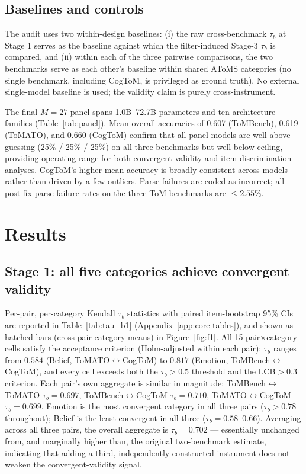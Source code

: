 \documentclass{article} %
\begin{document}
 

\subsection{Baselines and controls}
\label{sec:methods-baselines}
 
The audit uses two within-design baselines: (i) the raw cross-benchmark $\tau_b$ at Stage 1 serves as the baseline against which the filter-induced Stage-3 $\tau_b$ is compared, and (ii) within each of the three pairwise comparisons, the two benchmarks serve as each other's baseline within shared AToMS categories (no single benchmark, including CogToM, is privileged as ground truth). No external single-model baseline is used; the validity claim is purely cross-instrument.
 
The final $M=27$ panel spans 1.0B--72.7B parameters and ten architecture families (Table~\ref{tab:panel}). Mean overall accuracies of 0.607 (ToMBench), 0.619 (ToMATO), and 0.660 (CogToM) confirm that all panel models are well above guessing (25\% / 25\% / 25\%) on all three benchmarks but well below ceiling, providing operating range for both convergent-validity and item-discrimination analyses. CogToM's higher mean accuracy is broadly consistent across models rather than driven by a few outliers. Parse failures are coded as incorrect; all post-fix parse-failure rates on the three ToM benchmarks are $\le 2.55\%$.
 
\section{Results}
\label{sec:results}
 
\subsection{Stage 1: all five categories achieve convergent validity}
\label{sec:results-stage1}
 
Per-pair, per-category Kendall $\tau_b$ statistics with paired item-bootstrap 95\% CIs are reported in Table~\ref{tab:tau_b1} (Appendix~\ref{app:core-tables}), and shown as hatched bars (cross-pair category means) in Figure~\ref{fig:f1}. All 15 pair$\times$category cells satisfy the acceptance criterion (Holm-adjusted within each pair): $\tau_b$ ranges from $0.584$ (Belief, ToMATO$\leftrightarrow$CogToM) to $0.817$ (Emotion, ToMBench$\leftrightarrow$CogToM), and every cell exceeds both the $\tau_b>0.5$ threshold and the LCB$>0.3$ criterion. Each pair's own aggregate is similar in magnitude: ToMBench$\leftrightarrow$ToMATO $\tau_b=0.697$, ToMBench$\leftrightarrow$CogToM $\tau_b=0.710$, ToMATO$\leftrightarrow$CogToM $\tau_b=0.699$. Emotion is the most convergent category in all three pairs ($\tau_b>0.78$ throughout); Belief is the least convergent in all three ($\tau_b=0.58$--$0.66$). Averaging across all three pairs, the overall aggregate is $\tau_b=0.702$ --- essentially unchanged from, and marginally higher than, the original two-benchmark estimate, indicating that adding a third, independently-constructed instrument does not weaken the convergent-validity signal.
 
\end{document}
